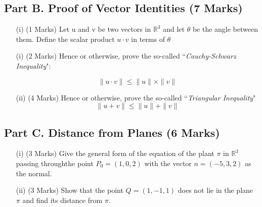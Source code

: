 \documentclass[a4paper,12pt]{article}
\begin{document}
	\subsection*{Part B. Proof of Vector Identities (7 Marks)}
	\begin{itemize}
		\item[(i)] (1 Marks) Let u and v be two vectors in $\mathbb{R}^3$ and let $\theta$ be the angle between them. Define the scalar product $u \cdot v$ in terms of $\theta$ 
		\item[(i)] (2 Marks) Hence or otherwise, prove the so-called ``\textit{Cauchy-Schwarz Inequality}":
		
		\[ \|u \cdot v \|  \leq \|u \|\times \| v \|  \]
		\item[(ii)] (4 Marks) Hence or otherwise, prove the so-called ``\textit{Triangular Inequality}"
		\[ \|u + v\|  \leq  \|u \| +  \| v \| \]
		
%		
	\end{itemize}
	
	


\subsection*{Part C. Distance from Planes (6 Marks)}	

\begin{itemize}
	\item[(i)] (3 Marks) Give the general form of the equation of the plant $\pi$ in $\mathbb{R}^3$ passing throughthe point $P_0 =(1,0,2)$ with the vector $n=(-5,3,2)$ as the normal.
	
	
	\item[(ii)] (3 Marks) Show that the point $Q=(1,-1,1)$ does not lie in the plane $\pi$ and find its distance from $\pi$.
\end{itemize}
\end{document}
